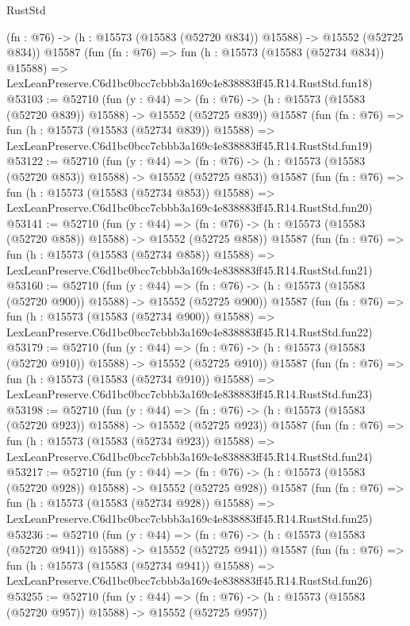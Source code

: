 \begin{lexlean}{RustStd}
\begin{coremodule}
    (fn : @76) -> (h : @15573 (@15583 (@52720 @834)) @15588) -> @15552 (@52725 @834))
    @15587
    (fun (fn : @76) =>
    fun (h : @15573 (@15583 (@52734 @834)) @15588) =>
    LexLeanPreserve.C6d1bc0bcc7cbbb3a169c4e838883ff45.R14.RustStd.fun18)
@53103 := @52710
    (fun (y : @44) =>
    (fn : @76) -> (h : @15573 (@15583 (@52720 @839)) @15588) -> @15552 (@52725 @839))
    @15587
    (fun (fn : @76) =>
    fun (h : @15573 (@15583 (@52734 @839)) @15588) =>
    LexLeanPreserve.C6d1bc0bcc7cbbb3a169c4e838883ff45.R14.RustStd.fun19)
@53122 := @52710
    (fun (y : @44) =>
    (fn : @76) -> (h : @15573 (@15583 (@52720 @853)) @15588) -> @15552 (@52725 @853))
    @15587
    (fun (fn : @76) =>
    fun (h : @15573 (@15583 (@52734 @853)) @15588) =>
    LexLeanPreserve.C6d1bc0bcc7cbbb3a169c4e838883ff45.R14.RustStd.fun20)
@53141 := @52710
    (fun (y : @44) =>
    (fn : @76) -> (h : @15573 (@15583 (@52720 @858)) @15588) -> @15552 (@52725 @858))
    @15587
    (fun (fn : @76) =>
    fun (h : @15573 (@15583 (@52734 @858)) @15588) =>
    LexLeanPreserve.C6d1bc0bcc7cbbb3a169c4e838883ff45.R14.RustStd.fun21)
@53160 := @52710
    (fun (y : @44) =>
    (fn : @76) -> (h : @15573 (@15583 (@52720 @900)) @15588) -> @15552 (@52725 @900))
    @15587
    (fun (fn : @76) =>
    fun (h : @15573 (@15583 (@52734 @900)) @15588) =>
    LexLeanPreserve.C6d1bc0bcc7cbbb3a169c4e838883ff45.R14.RustStd.fun22)
@53179 := @52710
    (fun (y : @44) =>
    (fn : @76) -> (h : @15573 (@15583 (@52720 @910)) @15588) -> @15552 (@52725 @910))
    @15587
    (fun (fn : @76) =>
    fun (h : @15573 (@15583 (@52734 @910)) @15588) =>
    LexLeanPreserve.C6d1bc0bcc7cbbb3a169c4e838883ff45.R14.RustStd.fun23)
@53198 := @52710
    (fun (y : @44) =>
    (fn : @76) -> (h : @15573 (@15583 (@52720 @923)) @15588) -> @15552 (@52725 @923))
    @15587
    (fun (fn : @76) =>
    fun (h : @15573 (@15583 (@52734 @923)) @15588) =>
    LexLeanPreserve.C6d1bc0bcc7cbbb3a169c4e838883ff45.R14.RustStd.fun24)
@53217 := @52710
    (fun (y : @44) =>
    (fn : @76) -> (h : @15573 (@15583 (@52720 @928)) @15588) -> @15552 (@52725 @928))
    @15587
    (fun (fn : @76) =>
    fun (h : @15573 (@15583 (@52734 @928)) @15588) =>
    LexLeanPreserve.C6d1bc0bcc7cbbb3a169c4e838883ff45.R14.RustStd.fun25)
@53236 := @52710
    (fun (y : @44) =>
    (fn : @76) -> (h : @15573 (@15583 (@52720 @941)) @15588) -> @15552 (@52725 @941))
    @15587
    (fun (fn : @76) =>
    fun (h : @15573 (@15583 (@52734 @941)) @15588) =>
    LexLeanPreserve.C6d1bc0bcc7cbbb3a169c4e838883ff45.R14.RustStd.fun26)
@53255 := @52710
    (fun (y : @44) =>
    (fn : @76) -> (h : @15573 (@15583 (@52720 @957)) @15588) -> @15552 (@52725 @957))

\end{coremodule}
\end{lexlean}
